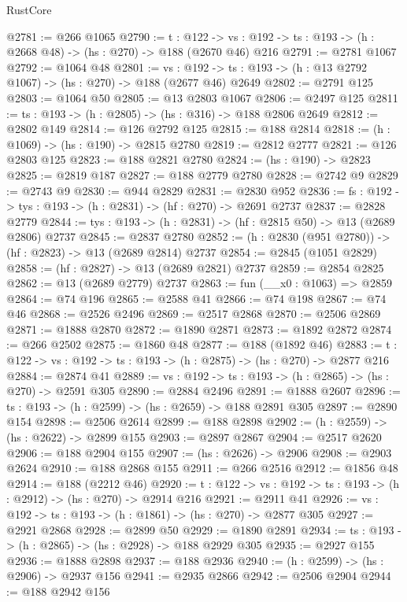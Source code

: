 \begin{lexlean}{RustCore}
\begin{coremodule}
@2781 := @266 @1065
@2790 := {t : @122} ->
  {vs : @192} -> {ts : @193} -> (h : @2668 @48) -> (hs : @270) -> @188 (@2670 @46) @216
@2791 := @2781 @1067
@2792 := @1064 @48
@2801 := {vs : @192} ->
  {ts : @193} -> (h : @13 @2792 @1067) -> (hs : @270) -> @188 (@2677 @46) @2649
@2802 := @2791 @125
@2803 := @1064 @50
@2805 := @13 @2803 @1067
@2806 := @2497 @125
@2811 := {ts : @193} -> (h : @2805) -> (hs : @316) -> @188 @2806 @2649
@2812 := @2802 @149
@2814 := @126 @2792 @125
@2815 := @188 @2814
@2818 := (h : @1069) -> (hs : @190) -> @2815 @2780
@2819 := @2812 @2777
@2821 := @126 @2803 @125
@2823 := @188 @2821 @2780
@2824 := (hs : @190) -> @2823
@2825 := @2819 @187
@2827 := @188 @2779 @2780
@2828 := @2742 @9
@2829 := @2743 @9
@2830 := @944 @2829
@2831 := @2830 @952
@2836 := {fs : @192} -> {tys : @193} -> (h : @2831) -> (hf : @270) -> @2691 @2737
@2837 := @2828 @2779
@2844 := {tys : @193} -> (h : @2831) -> (hf : @2815 @50) -> @13 (@2689 @2806) @2737
@2845 := @2837 @2780
@2852 := (h : @2830 (@951 @2780)) -> (hf : @2823) -> @13 (@2689 @2814) @2737
@2854 := @2845 (@1051 @2829)
@2858 := (hf : @2827) -> @13 (@2689 @2821) @2737
@2859 := @2854 @2825
@2862 := @13 (@2689 @2779) @2737
@2863 := fun (__x0 : @1063) => @2859
@2864 := @74 @196
@2865 := @2588 @41
@2866 := @74 @198
@2867 := @74 @46
@2868 := @2526 @2496
@2869 := @2517 @2868
@2870 := @2506 @2869
@2871 := @1888 @2870
@2872 := @1890 @2871
@2873 := @1892 @2872
@2874 := @266 @2502
@2875 := @1860 @48
@2877 := @188 (@1892 @46)
@2883 := {t : @122} -> {vs : @192} -> {ts : @193} -> (h : @2875) -> (hs : @270) -> @2877 @216
@2884 := @2874 @41
@2889 := {vs : @192} -> {ts : @193} -> (h : @2865) -> (hs : @270) -> @2591 @305
@2890 := @2884 @2496
@2891 := @1888 @2607
@2896 := {ts : @193} -> (h : @2599) -> (hs : @2659) -> @188 @2891 @305
@2897 := @2890 @154
@2898 := @2506 @2614
@2899 := @188 @2898
@2902 := (h : @2559) -> (hs : @2622) -> @2899 @155
@2903 := @2897 @2867
@2904 := @2517 @2620
@2906 := @188 @2904 @155
@2907 := (hs : @2626) -> @2906
@2908 := @2903 @2624
@2910 := @188 @2868 @155
@2911 := @266 @2516
@2912 := @1856 @48
@2914 := @188 (@2212 @46)
@2920 := {t : @122} -> {vs : @192} -> {ts : @193} -> (h : @2912) -> (hs : @270) -> @2914 @216
@2921 := @2911 @41
@2926 := {vs : @192} -> {ts : @193} -> (h : @1861) -> (hs : @270) -> @2877 @305
@2927 := @2921 @2868
@2928 := @2899 @50
@2929 := @1890 @2891
@2934 := {ts : @193} -> (h : @2865) -> (hs : @2928) -> @188 @2929 @305
@2935 := @2927 @155
@2936 := @1888 @2898
@2937 := @188 @2936
@2940 := (h : @2599) -> (hs : @2906) -> @2937 @156
@2941 := @2935 @2866
@2942 := @2506 @2904
@2944 := @188 @2942 @156

\end{coremodule}
\end{lexlean}
